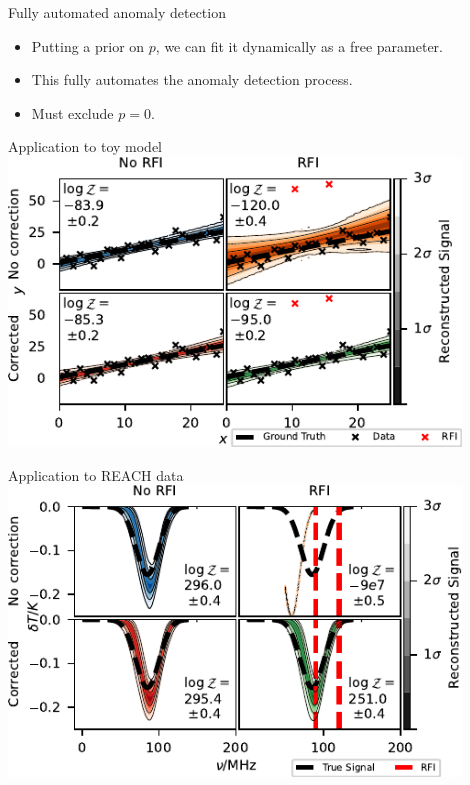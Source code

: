 \documentclass[aspectratio=169]{beamer}
\begin{document}
  \begin{frame}{Fully automated anomaly detection}
    \begin{itemize}
    \item Putting a prior on $p$, we can fit it dynamically as a free parameter.
    \item This fully automates the anomaly detection process.
    \item Must exclude $p=0$.
    \end{itemize}
\end{frame}

\begin{frame}{Application to toy model}
    \centering
    \includegraphics[width=0.9\textwidth]{images/4pane_toy_sidebar.pdf}
\end{frame}

\begin{frame}{Application to REACH data}
    \centering
    \includegraphics[width=0.9\textwidth]{images/4pane_reach_sidebar.pdf}
\end{frame}
\end{document}

